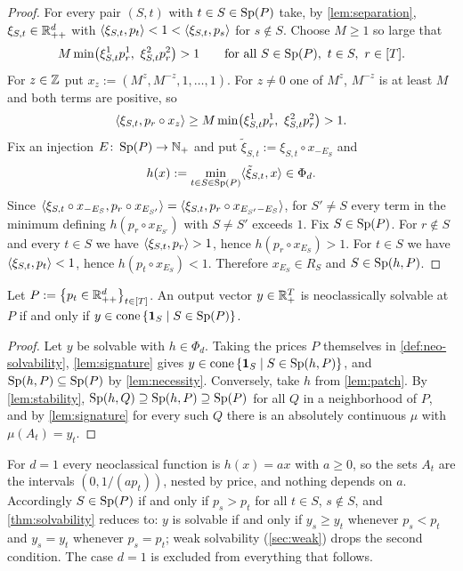 \begin{proof}
For every pair $(S,t)$ with $t\in S\in\Sp(P)$ take, by \cref{lem:separation}, $\xi_{S,t}\in\Rpp[d]$ with $\ip{\xi_{S,t}}{p_t}<1<\ip{\xi_{S,t}}{p_s}$ for $s\notin S$. Choose $M\ge1$ so large that
\[
M\min\bigl(\xi^1_{S,t}p^1_r,\ \xi^2_{S,t}p^2_r\bigr)>1\qquad\text{for all }S\in\Sp(P),\ t\in S,\ r\in[T].
\]
For $z\in\Z$ put $x_z:=(M^z,M^{-z},1,\dots,1)$. For $z\ne0$ one of $M^z$, $M^{-z}$ is at least $M$ and both terms are positive, so
\[
\ip{\xi_{S,t}}{p_r\circ x_z}\ge M\min\bigl(\xi^1_{S,t}p^1_r,\ \xi^2_{S,t}p^2_r\bigr)>1 .
\]
Fix an injection $E\colon\Sp(P)\to\N_+$ and put $\tilde\xi_{S,t}:=\xi_{S,t}\circ x_{-E_S}$ and
\[
h(x):=\min_{t\in S\in\Sp(P)}\ip{\tilde\xi_{S,t}}{x}\in\Phi_d .
\]
Since $\ip{\xi_{S,t}\circ x_{-E_S}}{p_r\circ x_{E_{S'}}}=\ip{\xi_{S,t}}{p_r\circ x_{E_{S'}-E_S}}$, for $S'\ne S$ every term in the minimum defining $h(p_r\circ x_{E_{S'}})$ with $S\ne S'$ exceeds $1$. Fix $S\in\Sp(P)$. For $r\notin S$ and every $t\in S$ we have $\ip{\xi_{S,t}}{p_r}>1$, hence $h(p_r\circ x_{E_S})>1$. For $t\in S$ we have $\ip{\xi_{S,t}}{p_t}<1$, hence $h(p_t\circ x_{E_S})<1$. Therefore $x_{E_S}\in R_S$ and $S\in\Sp(h,P)$.
\end{proof}

\begin{theorem}\label{thm:solvability}
Let $P:=\set{p_t\in\Rpp[d]}_{t\in[T]}$. An output vector $y\in\Rp[T]$ is neoclassically solvable at $P$ if and only if $y\in\cone\set{\ind S\mid S\in\Sp(P)}$.
\end{theorem}

\begin{proof}
Let $y$ be solvable with $h\in\Phi_d$. Taking the prices $P$ themselves in \cref{def:neo-solvability}, \cref{lem:signature} gives $y\in\cone\set{\ind S\mid S\in\Sp(h,P)}$, and $\Sp(h,P)\subseteq\Sp(P)$ by \cref{lem:necessity}. Conversely, take $h$ from \cref{lem:patch}. By \cref{lem:stability}, $\Sp(h,Q)\supseteq\Sp(h,P)\supseteq\Sp(P)$ for all $Q$ in a neighborhood of $P$, and by \cref{lem:signature} for every such $Q$ there is an absolutely continuous $\mu$ with $\mu(A_t)=y_t$.
\end{proof}

\begin{remark}\label{rem:d1}
For $d=1$ every neoclassical function is $h(x)=ax$ with $a\ge0$, so the sets $A_t$ are the intervals $(0,1/(ap_t))$, nested by price, and nothing depends on $a$. Accordingly $S\in\Sp(P)$ if and only if $p_s>p_t$ for all $t\in S$, $s\notin S$, and \cref{thm:solvability} reduces to: $y$ is solvable if and only if $y_s\ge y_t$ whenever $p_s<p_t$ and $y_s=y_t$ whenever $p_s=p_t$; weak solvability (\cref{sec:weak}) drops the second condition. The case $d=1$ is excluded from everything that follows.
\end{remark}

